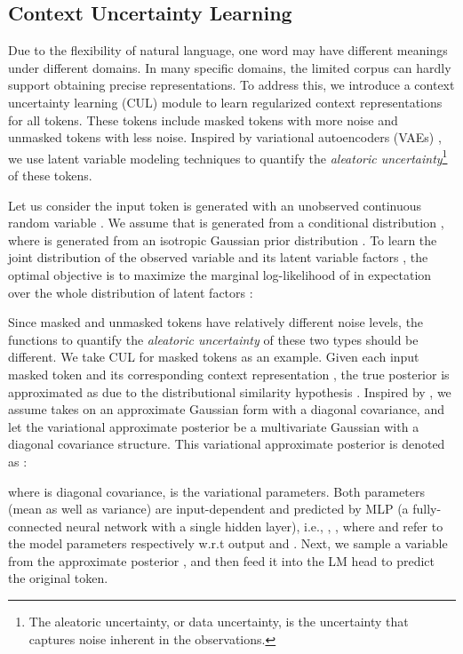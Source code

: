 \documentclass[11pt]{article}
\begin{document}
\subsection{Context Uncertainty Learning} \label{sec:cul}
Due to the flexibility of natural language, one word may have different meanings under different domains.
In many specific domains, the limited corpus can hardly support obtaining precise representations.
To address this, we introduce a context uncertainty learning (CUL) module to learn regularized context representations for all tokens.
These tokens include masked tokens with more noise and unmasked tokens with less noise.
Inspired by variational autoencoders (VAEs) \cite{DBLP:journals/corr/KingmaW13,DBLP:conf/iclr/HigginsMPBGBML17}, 
we use latent variable modeling techniques to quantify the \textit{aleatoric uncertainty}\footnote{The aleatoric uncertainty, or data uncertainty, is the uncertainty that captures noise inherent in the observations.}
\cite{der2009aleatory,abdar2021review} of these tokens.




Let us consider the input token  is generated with an unobserved continuous random variable .
We assume that  is generated from a conditional distribution , where  is generated from an isotropic Gaussian prior distribution 
.
To learn the joint distribution of the observed variable  and its latent variable factors , the optimal objective is to maximize the marginal log-likelihood of  in expectation over the whole distribution of latent factors :


Since masked and unmasked tokens have relatively different noise levels, the functions to quantify the \textit{aleatoric uncertainty} of these two types should be different.
{We take CUL for masked tokens as an example.}
Given each input masked token  and its corresponding context representation ,
the true posterior  is approximated as   due to the distributional similarity hypothesis \cite{DBLP:journals/corr/abs-1301-3781}.
Inspired by \citet{DBLP:journals/corr/KingmaW13},
we assume  takes on an approximate Gaussian form with a diagonal covariance, 
and let the variational approximate posterior
be a multivariate Gaussian with a diagonal covariance structure.
This variational approximate posterior is denoted as :

where  is diagonal covariance,  is the variational parameters.
Both parameters (mean as well as variance) are input-dependent and  predicted by MLP (a fully-connected neural network with a single hidden layer), i.e., , , where  and  refer to the model parameters respectively w.r.t output  and .
Next, we sample a variable  from the approximate posterior , and then feed it into the LM head to predict the original token.
\end{document}
